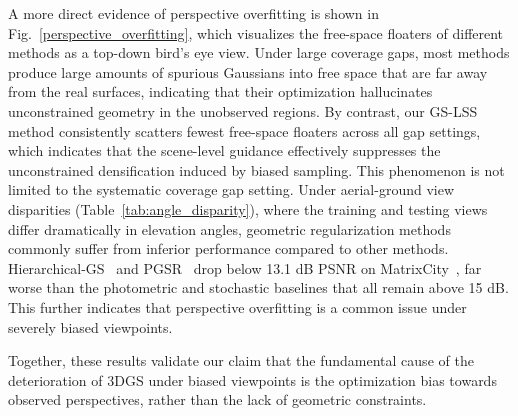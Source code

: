 \documentclass[lettersize,journal]{IEEEtran}
\begin{document}
A more direct evidence of perspective overfitting is shown in Fig.~\ref{perspective_overfitting}, which visualizes the free-space floaters of different methods as a top-down bird's eye view.
Under large coverage gaps, most methods produce large amounts of spurious Gaussians into free space that are far away from the real surfaces, indicating that their optimization hallucinates unconstrained geometry in the unobserved regions.
By contrast, our GS-LSS method consistently scatters fewest free-space floaters across all gap settings, which indicates that the scene-level guidance effectively suppresses the unconstrained densification induced by biased sampling.
This phenomenon is not limited to the systematic coverage gap setting. Under aerial-ground view disparities (Table~\ref{tab:angle_disparity}), where the training and testing views differ dramatically in elevation angles, geometric regularization methods commonly suffer from inferior performance compared to other methods. Hierarchical-GS~\cite{hierarchical} and PGSR~\cite{pgsr} drop below 13.1 dB PSNR on MatrixCity~\cite{matrixcity}, far worse than the photometric and stochastic baselines that all remain above 15 dB. This further indicates that perspective overfitting is a common issue under severely biased viewpoints.

Together, these results validate our claim that the fundamental cause of the deterioration of 3DGS under biased viewpoints is the optimization bias towards observed perspectives, rather than the lack of geometric constraints.
\end{document}
